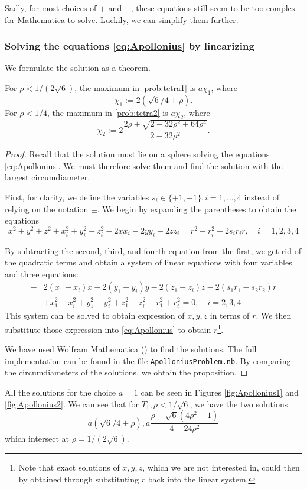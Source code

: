 Sadly, for most choices of $+$ and $-$, these equations still seem to be too complex for Mathematica to solve. Luckily, we can simplify them further. 

\subsubsection{Solving the equations \eqref{eq:Apollonius} by linearizing}

We formulate the solution as a theorem.
\begin{theorem}\label{thm:Apollonius}
	For $\rho < 1/(2\sqrt 6)$, the maximum in \ref{prob:tetra1} is $a \chi_1$, where
	$$\chi_1 := 2(\sqrt 6/4 + \rho).$$
	For $\rho < 1/4$, the maximum in \ref{prob:tetra2} is $a \chi_2$, where
	$$\chi_2 := 2 \frac{2\rho + \sqrt{2 - 32\rho^2 + 64 \rho^4}}{2-32\rho^2}.$$

\end{theorem}
\begin{proof}
	Recall that the solution must lie on a sphere solving the equations \eqref{eq:Apollonius}. We must therefore solve them and find the solution with the largest circumdiameter.

First, for clarity, we define the variables $s_i\in\{+1,-1\},i=1,\dots,4$ instead of relying on the notation $\pm$. We begin by expanding the parentheses to obtain the equations
$$x^2+y^2+z^2 + x_i^2 + y_i^2 + z_i^2 - 2xx_i - 2yy_i - 2zz_i = r^2 + r_i^2 + 2s_i r_i r,\quad i=1,2,3,4$$

By subtracting the second, third, and fourth equation from the first, we get rid of the quadratic terms and obtain a system of linear equations with four variables and three equations:
\begin{align*}-&2(x_1-x_i)x - 2(y_1-y_i)y -2 (z_1-z_i)z - 2(s_1r_1 - s_2r_2)r \\
	& + x_1^2-x_i^2 + y_1^2-y_i^2 + z_1^2 - z_i^2 -r_1^2 + r_i^2 = 0, \quad i=2,3,4
\end{align*}
This system can be solved to obtain expression of $x,y,z$ in terms of $r$. We then substitute those expression into \eqref{eq:Apollonius} to obtain $r$\footnote{Note that exact solutions of $x,y,z$, which we are not interested in, could then by obtained through substituting $r$ back into the linear system.}. 

We have used Wolfram Mathematica (\cite{Mathematica}) to find the solutions. The full implementation can be found in the file \texttt{ApolloniusProblem.nb}. By comparing the circumdiameters of the solutions, we obtain the proposition.

\end{proof}
All the solutions for the choice $a=1$ can be seen in Figures \ref{fig:Apollonius1} and \ref{fig:Apollonius2}. We can see that for $T_1, \rho < 1/\sqrt 6$, we have the two solutions
$$a(\sqrt 6 / 4 + \rho), a \frac{\rho - \sqrt 6 (4\rho^2 - 1)}{4-24 \rho^2}$$
which intersect at $\rho =1/(2\sqrt 6)$. 

